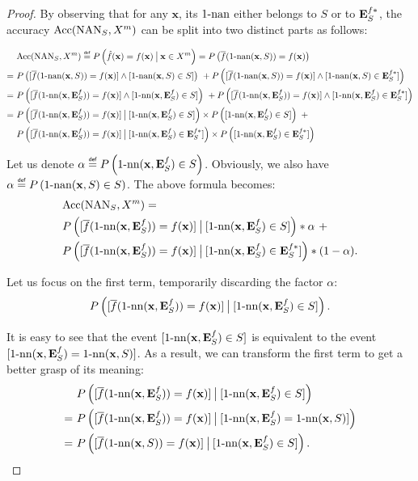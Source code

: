 \begin{proof}
By observing that for any $\mathbf{x}$, its $\nan$ either belongs to $S$ or to
$\esfs$, the accuracy $\acc(\NAN_S, X^m)$ can be split into two distinct parts as follows:

\begin{align*}
  &\acc(\NAN_S, X^m) \eqdef P\left(\hat{f}(\mathbf{x})=f(\mathbf{x}) \given[\big] \mathbf{x} \in
  X^m\right) = P\left(\albl{\nan(\mathbf{x}, S)} = f(\mathbf{x})\right)\\
  =~&P\left([\albl{\nan(\mathbf{x}, S)} = f(\mathbf{x}) ]\wedge
  [\nan(\mathbf{x}, S) \in S ] \right)~ +
  P\left([\albl{\nan(\mathbf{x}, S)} = f(\mathbf{x})] \wedge [\nan(\mathbf{x},
  S) \in \esfs]\right)\\
  =~&P\left([\albl{\nn(\mathbf{x}, \esf)} = f(\mathbf{x})] \wedge
  [\nn(\mathbf{x}, \esf) \in S ]\right)~ +
  P\left([\albl{\nn(\mathbf{x}, \esf)} = f(\mathbf{x})] \wedge
  [\nn(\mathbf{x}, \esf) \in \esfs]\right) \\
  =~&P\left([\albl{\nn(\mathbf{x}, \esf)} = f(\mathbf{x})] \given[\big]
  [\nn(\mathbf{x}, \esf) \in S ]\right) \times
  P\left([\nn(\mathbf{x}, \esf) \in S]\right) ~+ \\
  &P\left([\albl{\nn(\mathbf{x}, \esf)} = f(\mathbf{x})] \given[\big]
  [\nn(\mathbf{x}, \esf) \in \esfs]\right) \times
  P\left([ \nn(\mathbf{x}, \esf) \in \esfs]\right)
\end{align*}

Let us denote  $\alpha \eqdef P\left(\nn(\mathbf{x}, \esf) \in S\right)$.
Obviously, we also have $\alpha \eqdef P\left(\nan(\mathbf{x}, S) \in
S\right)$.  The above formula becomes:
\begin{align*}
  &\acc(\NAN_S, X^m) = \\&P\left([\albl{\nn(\mathbf{x}, \esf)} = f(\mathbf{x})]
  \given[\big] [\nn(\mathbf{x}, \esf) \in S] \right) * \alpha ~+ \\
  &P\left([\albl{\nn(\mathbf{x}, \esf)} = f(\mathbf{x})] \given[\big]
  [\nn(\mathbf{x}, \esf) \in \esfs]\right) * (1 - \alpha).
\end{align*}

Let us focus on the first term, temporarily discarding the factor $\alpha$:
$$P\left([\albl{\nn(\mathbf{x}, \esf)} = f(\mathbf{x})] \given[\big]
[\nn(\mathbf{x}, \esf) \in S] \right).$$

It is easy to see that the event $[\nn(\mathbf{x}, \esf) \in S]$ is equivalent
to the event $[\nn(\mathbf{x}, \esf) = \nn(\mathbf{x}, S)]$. As a result, we
can transform the first term to get a better grasp of its meaning:
\begin{align*}
  &P\left([\albl{\nn(\mathbf{x}, \esf)} = f(\mathbf{x})] \given[\big]
  [\nn(\mathbf{x}, \esf) \in S] \right)\\
  =~ &P\left([\albl{\nn(\mathbf{x},\esf)} = f(\mathbf{x})] \given[\big]
  [\nn(\mathbf{x}, \esf) = \nn(\mathbf{x}, S)]\right)\\
  =~ &P\left([\albl{\nn(\mathbf{x}, S)} = f(\mathbf{x})] \given[\big]
  [\nn(\mathbf{x}, \esf) \in S]\right).
\end{align*}


\end{proof}
